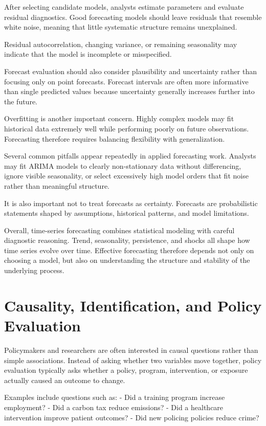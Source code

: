 \documentclass[
  11pt,
  oneside]{book}
\begin{document}
After selecting candidate models, analysts estimate parameters and evaluate residual diagnostics. Good forecasting models should leave residuals that resemble white noise, meaning that little systematic structure remains unexplained.

Residual autocorrelation, changing variance, or remaining seasonality may indicate that the model is incomplete or misspecified.

Forecast evaluation should also consider plausibility and uncertainty rather than focusing only on point forecasts. Forecast intervals are often more informative than single predicted values because uncertainty generally increases further into the future.

Overfitting is another important concern. Highly complex models may fit historical data extremely well while performing poorly on future observations. Forecasting therefore requires balancing flexibility with generalization.

Several common pitfalls appear repeatedly in applied forecasting work. Analysts may fit ARIMA models to clearly non-stationary data without differencing, ignore visible seasonality, or select excessively high model orders that fit noise rather than meaningful structure.

It is also important not to treat forecasts as certainty. Forecasts are probabilistic statements shaped by assumptions, historical patterns, and model limitations.

Overall, time-series forecasting combines statistical modeling with careful diagnostic reasoning. Trend, seasonality, persistence, and shocks all shape how time series evolve over time. Effective forecasting therefore depends not only on choosing a model, but also on understanding the structure and stability of the underlying process.

\chapter{Causality, Identification, and Policy Evaluation}\label{causality}

Policymakers and researchers are often interested in causal questions rather than simple associations. Instead of asking whether two variables move together, policy evaluation typically asks whether a policy, program, intervention, or exposure actually caused an outcome to change.

Examples include questions such as:
- Did a training program increase employment?
- Did a carbon tax reduce emissions?
- Did a healthcare intervention improve patient outcomes?
- Did new policing policies reduce crime?
\end{document}
